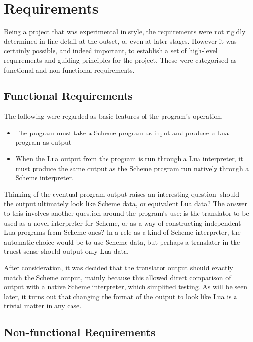 \section{Requirements}

Being a project that was experimental in style, the requirements were not
rigidly determined in fine detail at the outset, or even at later stages.
However it was certainly possible, and indeed important, to establish a set of
high-level requirements and guiding principles for the project. These were
categorised as functional and non-functional requirements.

\subsection{Functional Requirements}

The following were regarded as basic features of the program's operation.
\begin{itemize}
\item The program must take a Scheme program as input and produce a Lua program
as output.
\item When the Lua output from the program is run through a Lua interpreter, it
must produce the same output as the Scheme program run natively through a Scheme
interpreter.
\end{itemize}
\begin{framed}
Thinking of the eventual program output raises an interesting question: should
the output ultimately look like Scheme data, or equivalent Lua data?  The answer
to this involves another question around the program's use: is the translator
to be used as a novel interpreter for Scheme, or as a way of constructing
independent Lua programs from Scheme ones? In a role as a kind of Scheme
interpreter, the automatic choice would be to use Scheme data, but perhaps a
translator in the truest sense should output only Lua data.

After consideration, it was decided that the translator output should exactly
match the Scheme output, mainly because this allowed direct comparison of output
with a native Scheme interpreter, which simplified testing. As will be seen
later, it turns out that changing the format of the output to look like Lua is a
trivial matter in any case.
\end{framed}

\subsection{Non-functional Requirements}

